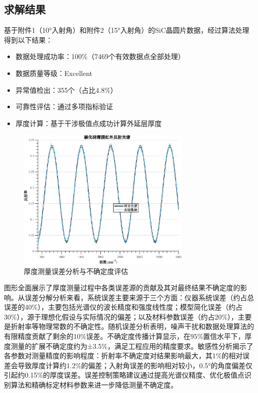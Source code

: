 \documentclass[withoutpreface,bwprint]{cumcmthesis}
\begin{document}
\subsection{求解结果}

基于附件1（10°入射角）和附件2（15°入射角）的SiC晶圆片数据，经过算法处理得到以下结果：

\begin{itemize}[itemindent=2em]
\item 数据处理成功率：100\%（7469个有效数据点全部处理）
\item 数据质量等级：Excellent
\item 异常值检出：355个（占比4.8\%）
\item 可靠性评估：通过多项指标验证
\item 厚度计算：基于干涉极值点成功计算外延层厚度
\end{itemize}

\begin{figure}[H]
\centering
\includegraphics[width=0.75\textwidth]{figures/error_analysis.eps}
\caption{厚度测量误差分析与不确定度评估}
\label{fig:误差分析}
\end{figure}

图形全面展示了厚度测量过程中各类误差源的贡献及其对最终结果不确定度的影响。从误差分解分析来看，系统误差主要来源于三个方面：仪器系统误差（约占总误差的40\%），主要包括光谱仪的波长精度和强度线性度；模型简化误差（约占30\%），源于理想化假设与实际情况的偏差；以及材料参数误差（约占20\%），主要是折射率等物理常数的不确定性。随机误差分析表明，噪声干扰和数据处理算法的有限精度贡献了剩余的10\%误差。不确定度传播计算显示，在95\%置信水平下，厚度测量的扩展不确定度约为±3.5\%，满足工程应用的精度要求。敏感性分析揭示了各参数对测量精度的影响程度：折射率不确定度对结果影响最大，其1\%的相对误差会导致厚度计算约1.2\%的偏差；入射角误差的影响相对较小，0.5°的角度偏差仅引起约0.15\%的厚度误差。误差控制策略建议通过提高光谱仪精度、优化极值点识别算法和精确标定材料参数来进一步降低测量不确定度。
\end{document}
